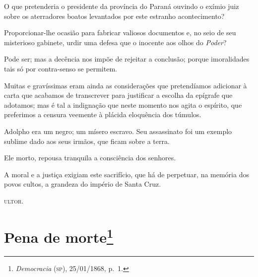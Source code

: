 O que pretenderia o presidente da província do Paraná ouvindo o exímio
juiz sobre os aterradores boatos levantados por este estranho
acontecimento?

Proporcionar-lhe ocasião para fabricar valiosos documentos e, no seio de
seu misterioso gabinete, urdir uma defesa que o inocente aos olhos do
\emph{Poder}?

Pode ser; mas a decência nos impõe de rejeitar a conclusão; porque
imoralidades tais só por contra-senso se permitem.

Muitas e gravíssimas eram ainda as considerações que pretendíamos
adicionar à carta que acabamos de transcrever para justificar a escolha
da epígrafe que adotamos; mas é tal a indignação que neste momento nos
agita o espírito, que preferimos a censura veemente à plácida eloquência
dos túmulos.

Adolpho era um negro; um mísero escravo. Seu assassinato foi um exemplo
sublime dado aos seus irmãos, que ficam sobre a terra.

Ele morto, repousa tranquila a consciência dos senhores.

A moral e a justiça exigiam este sacrifício, que há de perpetuar, na
memória dos povos cultos, a grandeza do império de Santa Cruz.

\textsc{ultor}.

\chapter{Pena de morte\footnote{\emph{Democracia} (\textsc{sp}), 25/01/1868, p.~1.}}

